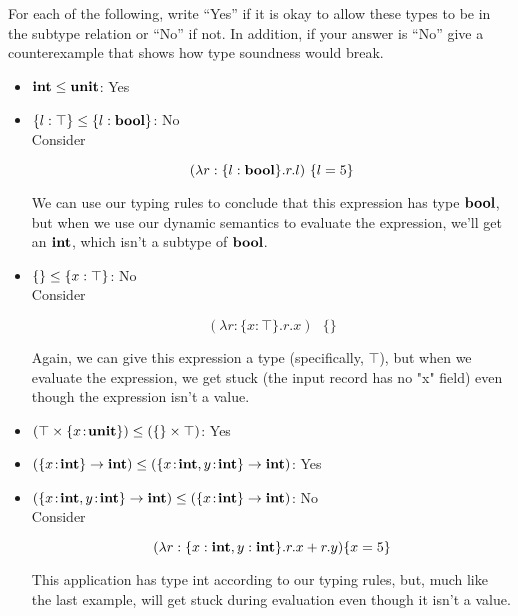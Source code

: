 \documentclass[10pt]{article}
\begin{document}
\begin{exercise}
  For each of the following, write ``Yes'' if it is okay to allow
  these types to be in the subtype relation or ``No'' if not. In
  addition, if your answer is ``No'' give a counterexample that shows
  how type soundness would break.

\begin{itemize}
\item $\mathsf{\textbf{int}} \leq \mathsf{\textbf{unit}}$: 
			Yes \\
\item $\{ l : \top \} \leq \{ l : \mathsf{\textbf{bool}} \}$: 
			No \\
			Consider 
			
			$$(\lambda r:\{l:\mathsf{\textbf{bool}}\}.r.l) \text{ } \{l = 5\}$$ 
			
			We can use our typing rules to conclude that this
			expression has type $\mathsf{\textbf{bool}}$, but when we use our dynamic semantics to 
			evaluate the expression, we'll get an $\mathsf{\textbf{int}}$, which isn't a subtype of 
			$\mathsf{\textbf{bool}}$.\\ 

\item $\{ \} \leq \{ x : \top \}$: 
			No \\
			Consider 
			
			$$(\lambda r:\{x:\top\}.r.x) \text{ } \{\}$$ 
			
			Again, we can give this expression a type (specifically, $\top$), but 
			when we evaluate the expression, we get stuck (the input record has no "x"
			field) even though the expression isn't a value.\\
			
\item $(\top \times \{ x \!:\! \mathsf{\textbf{unit}} \}) \leq (\{\} \times \top)$:
			Yes \\
			
			
\item $(\{ x \!:\! \mathsf{\textbf{int}} \} \rightarrow \mathsf{\textbf{int}}) \leq (\{ x \!:\! \mathsf{\textbf{int}}, y \!:\! 			\mathsf{\textbf{int}} \} \rightarrow \mathsf{\textbf{int}})$: 
			Yes \\
			
\item $(\{ x \!:\! \mathsf{\textbf{int}}, y \!:\! \mathsf{\textbf{int}} \} \rightarrow \mathsf{\textbf{int}}) \leq (\{ x \!:\! 
			\mathsf{\textbf{int}} \} \rightarrow \mathsf{\textbf{int}})$:
			No\\
			Consider 
			
			$$(\lambda r:\{x:\mathsf{\textbf{int}}, y:\mathsf{\textbf{int}}\}.r.x + r.y) \{x=5\}$$
			
			This application has type int according to our typing rules, but, much like
			the last example, will get stuck during evaluation even though it isn't a
			value.
			
\end{itemize}
\end{exercise}
\end{document}
